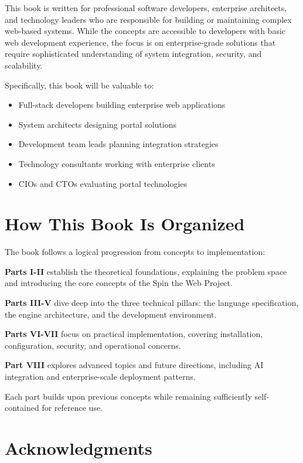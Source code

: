 This book is written for professional software developers, enterprise architects, and technology leaders who are responsible for building or maintaining complex web-based systems. While the concepts are accessible to developers with basic web development experience, the focus is on enterprise-grade solutions that require sophisticated understanding of system integration, security, and scalability.

Specifically, this book will be valuable to:
\begin{itemize}
\item Full-stack developers building enterprise web applications
\item System architects designing portal solutions
\item Development team leads planning integration strategies
\item Technology consultants working with enterprise clients
\item CIOs and CTOs evaluating portal technologies
\end{itemize}

\section*{How This Book Is Organized}

The book follows a logical progression from concepts to implementation:

\textbf{Parts I-II} establish the theoretical foundations, explaining the problem space and introducing the core concepts of the Spin the Web Project.

\textbf{Parts III-V} dive deep into the three technical pillars: the \wbdl language specification, the \webspinner engine architecture, and the \studio development environment.

\textbf{Parts VI-VII} focus on practical implementation, covering installation, configuration, security, and operational concerns.

\textbf{Part VIII} explores advanced topics and future directions, including AI integration and enterprise-scale deployment patterns.

Each part builds upon previous concepts while remaining sufficiently self-contained for reference use.

\section*{Acknowledgments}

